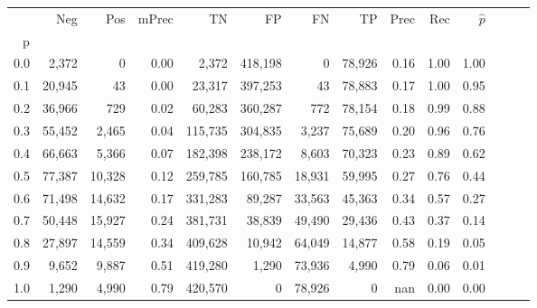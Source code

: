 \begin{tabular}{rrrrrrrrrrrrrr}
\toprule
{} &     Neg &     Pos & mPrec &       TN &       FP &      FN &      TP &  Prec &   Rec & $\hat{p}$ \\
p   &         &         &       &          &          &         &         &       &       &           \\
\midrule
0.0 &   2,372 &       0 &  0.00 &    2,372 &  418,198 &       0 &  78,926 &  0.16 &  1.00 &      1.00 \\
0.1 &  20,945 &      43 &  0.00 &   23,317 &  397,253 &      43 &  78,883 &  0.17 &  1.00 &      0.95 \\
0.2 &  36,966 &     729 &  0.02 &   60,283 &  360,287 &     772 &  78,154 &  0.18 &  0.99 &      0.88 \\
0.3 &  55,452 &   2,465 &  0.04 &  115,735 &  304,835 &   3,237 &  75,689 &  0.20 &  0.96 &      0.76 \\
0.4 &  66,663 &   5,366 &  0.07 &  182,398 &  238,172 &   8,603 &  70,323 &  0.23 &  0.89 &      0.62 \\
0.5 &  77,387 &  10,328 &  0.12 &  259,785 &  160,785 &  18,931 &  59,995 &  0.27 &  0.76 &      0.44 \\
0.6 &  71,498 &  14,632 &  0.17 &  331,283 &   89,287 &  33,563 &  45,363 &  0.34 &  0.57 &      0.27 \\
0.7 &  50,448 &  15,927 &  0.24 &  381,731 &   38,839 &  49,490 &  29,436 &  0.43 &  0.37 &      0.14 \\
0.8 &  27,897 &  14,559 &  0.34 &  409,628 &   10,942 &  64,049 &  14,877 &  0.58 &  0.19 &      0.05 \\
0.9 &   9,652 &   9,887 &  0.51 &  419,280 &    1,290 &  73,936 &   4,990 &  0.79 &  0.06 &      0.01 \\
1.0 &   1,290 &   4,990 &  0.79 &  420,570 &        0 &  78,926 &       0 &   nan &  0.00 &      0.00 \\
\bottomrule
\end{tabular}
